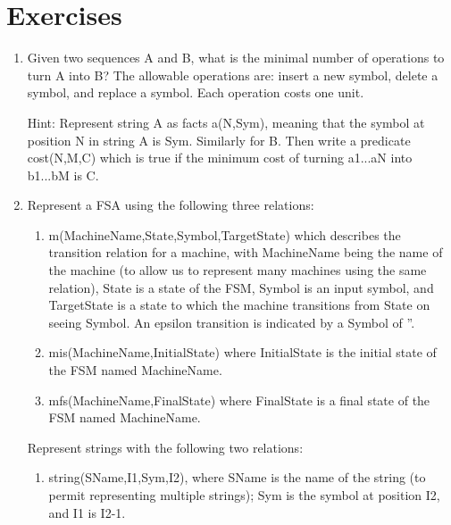 
\setlength{\topmargin}{-0.6in} %
\setlength{\oddsidemargin}{-0.1in}
\setlength{\footheight}{1.5in}
\setlength{\footskip}{0.5in}    %
\setlength{\textheight}{9in}  %
\setlength{\textwidth}{6.8in} %

 \sloppy 

\section{Exercises}


\begin{enumerate}
\item
Given two sequences A and B, what is the minimal number of operations
to turn A into B?  The allowable operations are: insert a new symbol,
delete a symbol, and replace a symbol.  Each operation costs one unit.

Hint: Represent string A as facts a(N,Sym), meaning that the symbol at 
position N in string A is Sym.  Similarly for B.  Then write a
predicate cost(N,M,C) which is true if the minimum cost of turning
a1...aN into b1...bM is C.

\item
Represent a FSA using the following three relations:
\begin{enumerate}
\item
m(MachineName,State,Symbol,TargetState) which describes the transition
relation for a machine, with MachineName being the name of the machine
(to allow us to represent many machines using the same relation),
State is a state of the FSM, Symbol is an input symbol, and
TargetState is a state to which the machine transitions from State on
seeing Symbol.  An epsilon transition is indicated by a Symbol of ''.

\item
mis(MachineName,InitialState) where InitialState is the initial state
of the FSM named MachineName.

\item
mfs(MachineName,FinalState) where FinalState is a final state of the
FSM named MachineName.
\end{enumerate}

Represent strings with the following two relations:
\begin{enumerate}
\item 
string(SName,I1,Sym,I2), where SName is the name of the string (to
permit representing multiple strings); Sym is the symbol at position
I2, and I1 is I2-1.


\end{enumerate}
\end{enumerate}
